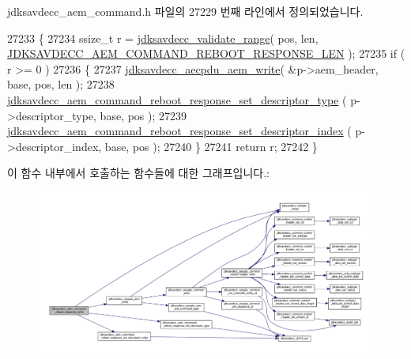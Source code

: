 jdksavdecc\+\_\+aem\+\_\+command.\+h 파일의 27229 번째 라인에서 정의되었습니다.


\begin{DoxyCode}
27233 \{
27234     ssize\_t r = \hyperlink{group__util_ga9c02bdfe76c69163647c3196db7a73a1}{jdksavdecc\_validate\_range}( pos, len, 
      \hyperlink{group__command__reboot__response_ga4ddd352a3b1c5e5bb6db634872ab08e8}{JDKSAVDECC\_AEM\_COMMAND\_REBOOT\_RESPONSE\_LEN} );
27235     \textcolor{keywordflow}{if} ( r >= 0 )
27236     \{
27237         \hyperlink{group__aecpdu__aem_gad658e55771cce77cecf7aae91e1dcbc5}{jdksavdecc\_aecpdu\_aem\_write}( &p->aem\_header, base, pos, len );
27238         \hyperlink{group__command__reboot__response_ga762d5fed4c95ec1874fca622c6caa06b}{jdksavdecc\_aem\_command\_reboot\_response\_set\_descriptor\_type}
      ( p->descriptor\_type, base, pos );
27239         \hyperlink{group__command__reboot__response_ga7561a41dfeba6398c2b8a78af8ca09f0}{jdksavdecc\_aem\_command\_reboot\_response\_set\_descriptor\_index}
      ( p->descriptor\_index, base, pos );
27240     \}
27241     \textcolor{keywordflow}{return} r;
27242 \}
\end{DoxyCode}


이 함수 내부에서 호출하는 함수들에 대한 그래프입니다.\+:
\nopagebreak
\begin{figure}[H]
\begin{center}
\leavevmode
\includegraphics[width=350pt]{group__command__reboot__response_ga6fac8c4842ef9059b0db590afb1b069d_cgraph}
\end{center}
\end{figure}


